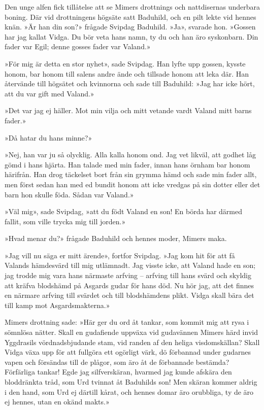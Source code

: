 Den unge alfen fick tillåtelse att se Mimers drottnings och nattdisernas
underbara boning. Där vid drottningens högsäte satt Baduhild, och en
pilt lekte vid hennes knän. »Är han din son?» frågade Svipdag Baduhild.
»Ja», svarade
\protect\hypertarget{lb1625905.xhtmlux5cux23start121}{}{}\protect\hypertarget{lb1625905.xhtmlux5cux23start121-a}{}{}\protect\hypertarget{lb1625905.xhtmlux5cux23start121-b}{}{}\protect\hypertarget{lb1625905.xhtmlux5cux23start121-c}{}{}\protect\hypertarget{lb1625905.xhtmlux5cux23start121-d}{}{}
hon. »Gossen har jag kallat Vidga. Du bör veta hans namn, ty du och han
äro syskonbarn. Din fader var Egil; denne gosses fader var Valand.»

»För mig är detta en stor nyhet», sade Svipdag. Han lyfte upp gossen,
kysste honom, bar honom till salens andre ände och tillsade honom att
leka där. Han återvände till högsätet och kvinnorna och sade till
Baduhild: »Jag har icke hört, att du var gift med Valand.»

»Det var jag ej häller. Mot min vilja och mitt vetande vardt Valand mitt
barns fader.»

»Då hatar du hans minne?»

»Nej, han var ju så olycklig. Alla kalla honom ond. Jag vet likväl, att
godhet låg gömd i hans hjärta. Han talade med min fader, innan hans
örnham bar honom härifrån. Han drog täckelset bort från sin grymma hämd
och sade min fader allt, men först sedan han med ed bundit honom att
icke vredgas på sin dotter eller det barn hon skulle föda. Sådan var
Valand.»

»Väl mig», sade Svipdag, »att du födt Valand en son! En börda har därmed
fallit, som ville trycka mig till jorden.»

»Hvad menar du?» frågade Baduhild och hennes moder, Mimers maka.

»Jag vill nu säga er mitt ärende», fortfor Svipdag. »Jag kom hit för att
få Valands hämdesvärd till mig utlämnadt. Jag visste icke, att Valand
hade en son; jag trodde mig vara hans närmaste arfving -- arfving till
hans svärd och skyldig att kräfva blodshämd på Asgards gudar för hans
död. Nu hör jag, att det finnes en närmare arfving till svärdet och till
blodshämdens plikt. Vidga skall bära det till kamp mot Asgardsmakterna.»

Mimers drottning sade: »Här ger du ord åt tankar, som kommit mig att
rysa i sömnlösa nätter. Skall en gudafiende uppväxa vid gudavännen
Mimers härd invid Yggdrasils vördnadsbjudande stam, vid randen af den
heliga visdomskällan? Skall Vidga växa upp för att fullgöra ett ogörligt
värk, dö förbannad under gudarnes vapen och försändas till de plågor,
\protect\hypertarget{lb1625905.xhtmlux5cux23start122}{}{}\protect\hypertarget{lb1625905.xhtmlux5cux23start122-a}{}{}\protect\hypertarget{lb1625905.xhtmlux5cux23start122-b}{}{}\protect\hypertarget{lb1625905.xhtmlux5cux23start122-c}{}{}\protect\hypertarget{lb1625905.xhtmlux5cux23start122-d}{}{}
som äro åt de förbannade bestämda? Förfärliga tankar! Egde jag
silfverskäran, hvarmed jag kunde afskära den bloddränkta tråd, som Urd
tvinnat åt Baduhilds son! Men skäran kommer aldrig i den hand, som Urd
ej därtill kårat, och hennes domar äro orubbliga, ty de äro ej hennes,
utan en okänd makts.»

